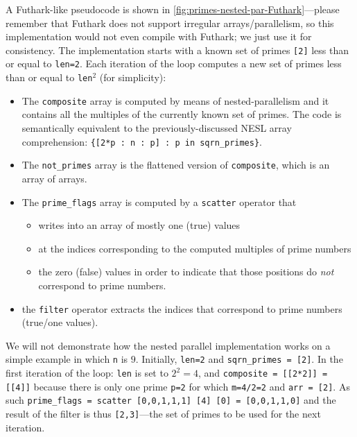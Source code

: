 \documentclass[acmsmall,review]{acmart}\settopmatter{printfolios=true,printccs=false,printacmref=false}
\begin{document}
A Futhark-like pseudocode is shown in 
\cref{fig:primes-nested-par-Futhark}---please remember that
Futhark does not support irregular arrays/parallelism, so 
this implementation would not even compile with Futhark; we
just use it for consistency.  The implementation starts with
a known set of primes {\tt [2]} less than or equal to {\tt len=2}.
Each iteration of the loop computes a new set of primes
less than or equal to {\tt len$^2$} (for simplicity):
\begin{itemize}
    \item The {\tt composite} array is computed by means of 
        nested-parallelism and it contains all the multiples 
        of the currently known set of primes. The code is 
        semantically equivalent to the previously-discussed 
        NESL array comprehension:
        {\tt \{[2*p : n : p] : p in sqrn\_primes\}}.
    \item The {\tt not\_primes} array is the flattened version
        of {\tt composite}, which is an array of arrays.
    \item The {\tt prime\_flags} array is computed by
        a \lstinline{scatter} operator that 
        \begin{itemize}
            \item writes into an array of mostly one (true) values
            \item at the indices corresponding to the computed 
                    multiples of prime numbers
            \item the zero (false) values in order to indicate
                    that those positions do {\em not} correspond
                    to prime numbers.
        \end{itemize}
    \item the \lstinline{filter} operator extracts the indices
            that correspond to prime numbers (true/one values).
\end{itemize}

We will not demonstrate how the nested parallel implementation
works on a simple example in which {\tt n} is $9$. 
Initially, {\tt len=2} and {\tt sqrn\_primes = [2]}.
In the first iteration of the loop: {\tt len} is set to $2^2 = 4$,
and {\tt composite = [[2*2]] = [[4]]} because there is only
one prime {\tt p=2} for which {\tt m=4/2=2} and {\tt arr = [2]}.
As such \lstinline{prime_flags = scatter [0,0,1,1,1] [4] [0] = [0,0,1,1,0]}
and the result of the filter is thus {\tt [2,3]}---the set of 
primes to be used for the next iteration.
\end{document}
